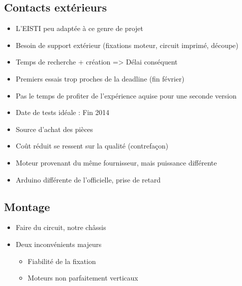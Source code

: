 \documentclass{beamer}
\begin{document}
{      %
      \subsection{Contacts extérieurs}
	\begin{frame}
	  \begin{itemize}
	    \item L'EISTI peu adaptée à ce genre de projet
	    \item Besoin de support extérieur (fixations moteur, circuit imprimé, découpe)
	    \item Temps de recherche + création => Délai conséquent
	    \item Premiers essais trop proches de la deadline (fin février)
	    \item Pas le temps de profiter de l'expérience aquise pour une seconde version
	    \item Date de tests idéale : Fin 2014
	  \end{itemize}
	\end{frame}
	
	\begin{frame}
	  \begin{itemize}
	    \item Source d'achat des pièces 
	    \item Coût réduit se ressent sur la qualité (contrefaçon)
	    \item Moteur provenant du même fournisseur, mais puissance différente
	    \item Arduino différente de l'officielle, prise de retard
	  \end{itemize}
	\end{frame}
	
      \subsection{Montage}
	\begin{frame}
	  \begin{itemize}
	    \item Faire du circuit, notre châssis
	    \item Deux inconvénients majeurs
	    \begin{itemize}
	      \item Fiabilité de la fixation
	      \item Moteurs non parfaitement verticaux
	    \end{itemize}
	  \end{itemize}
	\end{frame}

}
\end{document}
